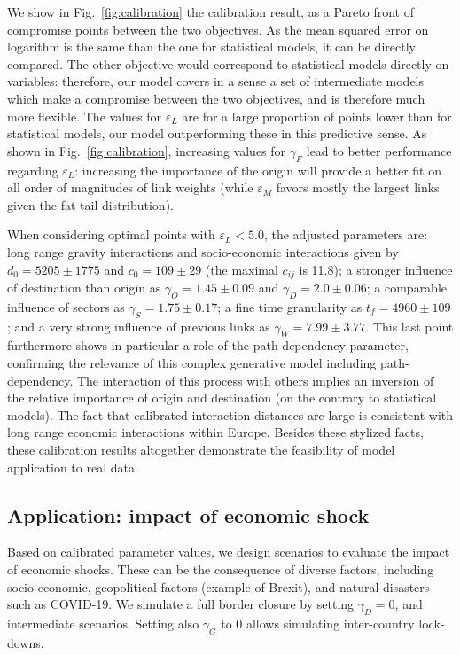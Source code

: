 \documentclass[10pt,letterpaper]{article}
\begin{document}
We show in Fig.~\ref{fig:calibration} the calibration result, as a Pareto front of compromise points between the two objectives. As the mean squared error on logarithm is the same than the one for statistical models, it can be directly compared. The other objective would correspond to statistical models directly on variables: therefore, our model covers in a sense a set of intermediate models which make a compromise between the two objectives, and is therefore much more flexible. The values for $\varepsilon_L$ are for a large proportion of points lower than for statistical models, our model outperforming these in this predictive sense. As shown in Fig.~\ref{fig:calibration}, increasing values for $\gamma_F$ lead to better performance regarding $\varepsilon_L$: increasing the importance of the origin will provide a better fit on all order of magnitudes of link weights (while $\varepsilon_M$ favors mostly the largest links given the fat-tail distribution).

When considering optimal points with $\varepsilon_L < 5.0$, the adjusted parameters are: long range gravity interactions and socio-economic interactions given by $d_0 = 5205 \pm 1775$ and $c_0 = 109 \pm 29$ (the maximal $c_{ij}$ is 11.8); a stronger influence of destination than origin as $\gamma_O = 1.45 \pm 0.09$ and $\gamma_D = 2.0 \pm 0.06$; a comparable influence of sectors as $\gamma_S = 1.75 \pm 0.17$; a fine time granularity as $t_f = 4960 \pm 109$; and a very strong influence of previous links as $\gamma_W = 7.99 \pm 3.77$. This last point furthermore shows in particular a role of the path-dependency parameter, confirming the relevance of this complex generative model including path-dependency. The interaction of this process with others implies an inversion of the relative importance of origin and destination (on the contrary to statistical models). The fact that calibrated interaction distances are large is consistent with long range economic interactions within Europe. Besides these stylized facts, these calibration results altogether demonstrate the feasibility of model application to real data.

\subsection*{Application: impact of economic shock}

Based on calibrated parameter values, we design scenarios to evaluate the impact of economic shocks. These can be the consequence of diverse factors, including socio-economic, geopolitical factors (example of Brexit), and natural disasters such as COVID-19. We simulate a full border closure by setting $\gamma_D = 0$, and intermediate scenarios. Setting also $\gamma_G$ to 0 allows simulating inter-country lock-downs.
\end{document}
